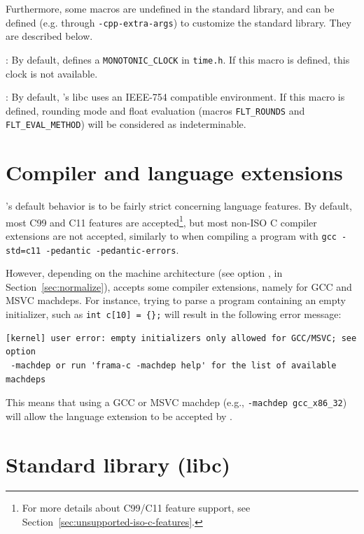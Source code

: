 Furthermore, some macros are undefined in the standard library, and can
be defined (e.g. through \lstinline|-cpp-extra-args|) to customize the \FramaC
standard library. They are described below.

\begin{description}
\item {}: By default, \FramaC defines
  a \lstinline|MONOTONIC_CLOCK| in \lstinline|time.h|. If this macro is defined,
  this clock is not available.
\item {}: By default, \FramaC's libc
  uses an IEEE-754 compatible environment. If this macro is defined,
  rounding mode and float evaluation
  (macros \lstinline|FLT_ROUNDS| and \lstinline|FLT_EVAL_METHOD|) will be
  considered as indeterminable.

\end{description}

\section{Compiler and language extensions}\label{sec:extensions}

\FramaC's default behavior is to be fairly strict concerning language features.
By default, most C99 and C11 features are accepted\footnote{For more details
about C99/C11 feature support, see
Section~\ref{sec:unsupported-iso-c-features}.}, but most non-ISO C compiler
extensions are not accepted, similarly to when compiling a program with
\verb+gcc -std=c11 -pedantic -pedantic-errors+.

However, depending on the machine architecture (see option
, in Section~\ref{sec:normalize}),
\FramaC accepts some compiler extensions, namely for GCC and MSVC machdeps.
For instance, trying to parse a program containing an empty initializer,
such as \verb+int c[10] = {};+ will result in the following error message:

\begin{verbatim}
[kernel] user error: empty initializers only allowed for GCC/MSVC; see option
 -machdep or run 'frama-c -machdep help' for the list of available machdeps
\end{verbatim}

This means that using a GCC or MSVC machdep (e.g., \verb+-machdep gcc_x86_32+)
will allow the language extension to be accepted by \FramaC.

\section{Standard library (libc)}\label{sec:libc}

